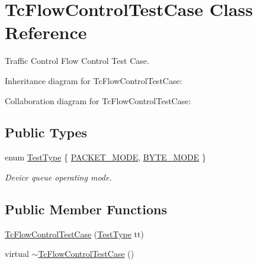 \hypertarget{classTcFlowControlTestCase}{}\section{Tc\+Flow\+Control\+Test\+Case Class Reference}
\label{classTcFlowControlTestCase}


Traffic Control Flow Control Test Case.  




Inheritance diagram for Tc\+Flow\+Control\+Test\+Case\+:


Collaboration diagram for Tc\+Flow\+Control\+Test\+Case\+:
\subsection*{Public Types}
\begin{DoxyCompactItemize}
\item 
enum \hyperlink{classTcFlowControlTestCase_a63146d60b911dd039c9cf960cbddb458}{Test\+Type} \{ \hyperlink{classTcFlowControlTestCase_a63146d60b911dd039c9cf960cbddb458a294d1e27d6e81fc7a19f37ec1f5ba1d8}{P\+A\+C\+K\+E\+T\+\_\+\+M\+O\+DE}, 
\hyperlink{classTcFlowControlTestCase_a63146d60b911dd039c9cf960cbddb458a10186dff385e013c5c5351795fdf6558}{B\+Y\+T\+E\+\_\+\+M\+O\+DE}
 \}\begin{DoxyCompactList}\small\item\em Device queue operating mode. \end{DoxyCompactList}
\end{DoxyCompactItemize}
\subsection*{Public Member Functions}
\begin{DoxyCompactItemize}
\item 
\hyperlink{classTcFlowControlTestCase_a7f6c80ada4b54183cc01c9829ad1eb07}{Tc\+Flow\+Control\+Test\+Case} (\hyperlink{classTcFlowControlTestCase_a63146d60b911dd039c9cf960cbddb458}{Test\+Type} tt)
\item 
virtual \hyperlink{classTcFlowControlTestCase_ab52a8d47e9379d4304849eee57b6f9bc}{$\sim$\+Tc\+Flow\+Control\+Test\+Case} ()
\end{DoxyCompactItemize}
